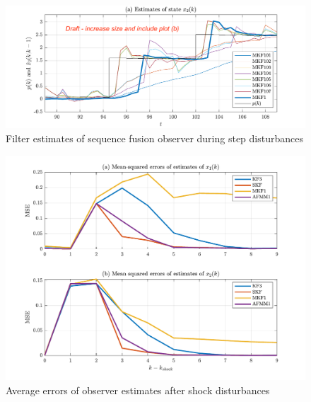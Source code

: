 \begin{figure}[htp]
	\centering
	\includegraphics[width=14cm]{images/rod-obs-sim-1-4-est-MKF-SF-plot-DRAFT.pdf}
	\caption{Filter estimates of sequence fusion observer during step disturbances}
	\label{fig:rod-obs-sim-1-4-est-MKF-SF-plot-DRAFT}
\end{figure}

\begin{figure}[htp]
	\centering
	\includegraphics[width=14cm]{images/rod_obs_sim2_7_mse_ashocks.pdf}
	\caption{Average errors of observer estimates after shock disturbances}
	\label{fig:rod_obs_sim2_7_mse_ashocks}
\end{figure}

